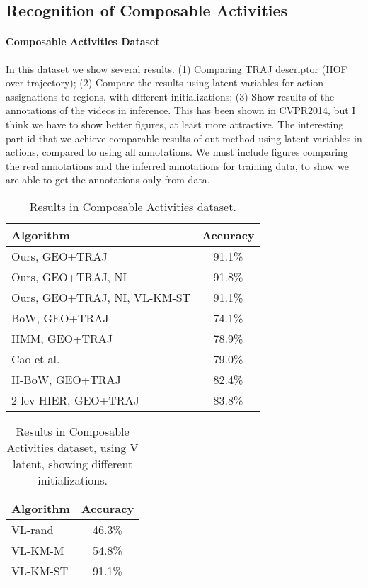 \subsection{Recognition of Composable Activities}

\paragraph{Composable Activities Dataset} In this dataset we show several results. (1) Comparing TRAJ descriptor (HOF over trajectory); (2) Compare the results using latent variables for action assignations to regions, with different initializations; (3) Show results of the annotations of the videos in inference. This has been shown in CVPR2014, but I think we have to show better figures, at least more attractive. The interesting part id that we achieve comparable results of out method using latent variables in actions, compared to using all annotations. We must include figures comparing the real annotations and the inferred annotations for training data, to show we are able to get the annotations only from data.

\begin{table}
\centering
\begin{tabular}{|l|c|}
\hline
\textbf{Algorithm} & \textbf{Accuracy}\\
\hline
Ours, GEO+TRAJ &  91.1\% \\
Ours, GEO+TRAJ, NI  & 91.8\% \\
Ours, GEO+TRAJ, NI, VL-KM-ST   & 91.1\% \\
\hline
BoW, GEO+TRAJ & 74.1\%    \\
HMM, GEO+TRAJ & 78.9\%  \\
Cao et al. \cite{cao2015spatio} & 79.0\% \\
H-BoW, GEO+TRAJ & 82.4\%   \\
2-lev-HIER, GEO+TRAJ & 83.8\%  \\
\hline
\end{tabular}
\caption{Results in Composable Activities dataset. }
\end{table}

\begin{table}
\centering
\begin{tabular}{|l|c|}
\hline
\textbf{Algorithm} & \textbf{Accuracy}\\
\hline
VL-rand   & 46.3\% \\
VL-KM-M   & 54.8\% \\
VL-KM-ST   & 91.1\% \\
\hline
\end{tabular}
\caption{Results in Composable Activities dataset, using V latent, showing different initializations. }
\end{table}

